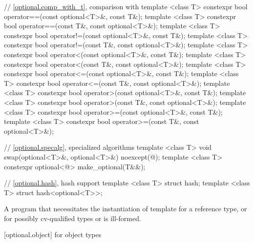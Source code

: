 \begin{codeblock}
{  // \ref{optional.comp_with_t}, comparison with 
  template <class T> constexpr bool operator==(const optional<T>&, const T&);
  template <class T> constexpr bool operator==(const T&, const optional<T>&);
  template <class T> constexpr bool operator!=(const optional<T>&, const T&);
  template <class T> constexpr bool operator!=(const T&, const optional<T>&);
  template <class T> constexpr bool operator<(const optional<T>&, const T&);
  template <class T> constexpr bool operator<(const T&, const optional<T>&);
  template <class T> constexpr bool operator<=(const optional<T>&, const T&);
  template <class T> constexpr bool operator<=(const T&, const optional<T>&);
  template <class T> constexpr bool operator>(const optional<T>&, const T&);
  template <class T> constexpr bool operator>(const T&, const optional<T>&);
  template <class T> constexpr bool operator>=(const optional<T>&, const T&);
  template <class T> constexpr bool operator>=(const T&, const optional<T>&);

  // \ref{optional.specalg}, specialized algorithms
  template <class T> void swap(optional<T>&, optional<T>&) noexcept(@\seebelow@);
  template <class T> constexpr optional<@\seebelow@> make_optional(T&&);

  // \ref{optional.hash}, hash support
  template <class T> struct hash;
  template <class T> struct hash<optional<T>>;
}
\end{codeblock}

\pnum
A program that necessitates the instantiation of template  for
a reference type, or for possibly cv-qualified types  or
 is ill-formed.

[optional.object]{ for object types}

